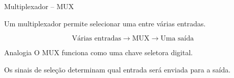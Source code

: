 \begin{frame}{Multiplexador -- MUX}

    Um multiplexador permite selecionar uma entre várias entradas.

    \[
        \boxed{\text{Várias entradas}}
        \longrightarrow
        \boxed{\text{MUX}}
        \longrightarrow
        \boxed{\text{Uma saída}}
    \]

    \vspace{0.5cm}

    \begin{block}{Analogia}
        O MUX funciona como uma chave seletora digital.
    \end{block}

    Os sinais de seleção determinam qual entrada será enviada
    para a saída.

\end{frame}